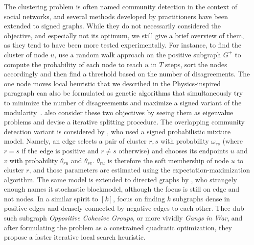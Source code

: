 The clustering problem is often named community detection in the context of social networks, and
several methods developed by practitioners have been extended to signed graphs. While they do not
necessarily considered the \pcc{} objective, and especially not its optimum, we still give a brief
overview of them, as they tend to have been more tested experimentally. For instance, to find the
cluster of node $u$, \textcite{Yang2007} use a random walk approach on the positive subgraph $G^+$
to compute the probability of each node to reach $u$ in $T$ steps, sort the nodes accordingly and
then find a threshold  based on the number of disagreements.
The one node moves local heuristic that we described in the Physics-inspired paragraph
 can also be formulated as genetic algorithms that simultaneously try to
minimize the number of disagreements and maximize a signed variant of the
modularity~\autocites{Li2013}{Amelio2013}. \Textcite{Anchuri2012} also consider these two objectives
by seeing them as eigenvalue problems and devise a iterative splitting procedure.
The overlapping community detection variant is considered by \textcite{Chen14}, who used a signed
probabilistic mixture model. Namely, an edge selects a pair of cluster $r,s$ with probability
$\omega_{rs}$ (where $r=s$ if the edge is positive and $r\neq s$ otherwise) and chooses its endpoints
$u$ and $v$ with probability $\theta_{ru}$ and $\theta_{sv}$. $\theta_{ru}$ is therefore the soft
membership of node $u$ to cluster $r$, and those parameters are estimated using the
expectation-maximization algorithm. The same model is extended to directed graphs by
\textcite{Jiang2015}, who strangely enough names it stochastic blockmodel, although the focus is
still on edge and not nodes.
In a similar spirit to \maxa{}$[k]$, \textcite{SignedGang} focus on finding $k$ subgraphs dense in
positive edges and densely connected by negative edges to each other. Thee dub such subgraph
\emph{Oppositive Cohesive Groups}, or more vividly \emph{Gangs in War}, and after formulating the
problem as a constrained quadratic optimization, they propose a faster iterative local search
heuristic.
